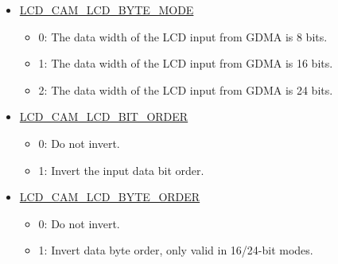 \documentclass[main\_\_EN.tex]{subfiles}
\begin{document}
\begin{itemize}
    \item \hyperref[fielddesc:LCDCAMLCDBYTEMODE]{LCD\_CAM\_LCD\_BYTE\_MODE}
    \begin{itemize}
        \item 0: The data width of the LCD input from GDMA is 8 bits.
        \item 1: The data width of the LCD input from GDMA is 16 bits.
        \item 2: The data width of the LCD input from GDMA is 24 bits.
    \end{itemize}
    \item \hyperref[fielddesc:LCDCAMLCDBITORDER]{LCD\_CAM\_LCD\_BIT\_ORDER}
    \begin{itemize}
        \item 0: Do not invert.
        \item 1: Invert the input data bit order.
    \end{itemize}
    \item \hyperref[fielddesc:LCDCAMLCDBYTEORDER]{LCD\_CAM\_LCD\_BYTE\_ORDER}
    \begin{itemize}
        \item 0: Do not invert.
        \item 1: Invert data byte order, only valid in 16/24-bit modes.
    \end{itemize}
\end{itemize}
\end{document}
